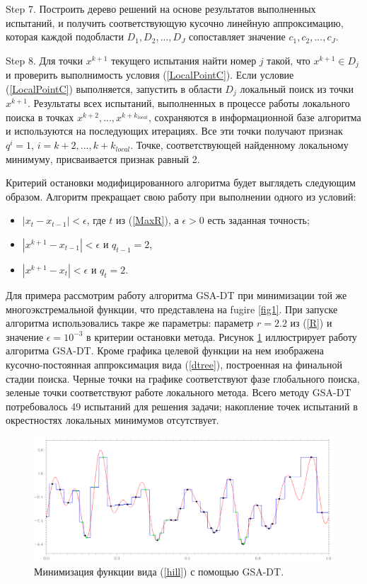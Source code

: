 \documentclass[entropy,article,submit,moreauthors,pdftex]{Definitions/mdpi}
\begin{document}
Step 7. Построить дерево решений на основе результатов выполненных испытаний, и получить соответствующую кусочно линейную аппроксимацию, которая каждой подобласти $D_1, D_2, ..., D_J$ сопоставляет значение $c_1, c_2, ..., c_J$.

Step 8. Для точки $x^{k+1}$ текущего испытания найти номер $j$ такой, что $x^{k+1} \in D_j$ и проверить выполнимость условия (\ref{LocalPointC}). Если условие (\ref{LocalPointC}) выполняется, запустить в области $D_j$ локальный поиск из точки $x^{k+1}$. 
Результаты всех испытаний, выполненных в процессе работы локального поиска в точках $x^{k+2}, ...,x^{k+k_{local}}$, сохраняются в информационной базе алгоритма и используются на последующих итерациях. 
Все эти точки получают признак $q^i=1$, $i = k+2, ... , k+k_{local}$. Точке, соответствующей найденному локальному минимуму, присваивается признак равный 2.

Критерий остановки модифицированного алгоритма будет выглядеть следующим образом. 
Алгоритм прекращает свою работу при выполнении одного из условий:

\begin{itemize}
	\item $|x_{t} - x_{t-1}|<\epsilon$, где $t$ из (\ref{MaxR}), а $\epsilon>0$ есть заданная точность;
	\item $|x^{k+1} - x_{t-1}|<\epsilon$ и $q_{t-1} = 2$,
	\item $|x^{k+1}-x_{t}|<\epsilon$ и $q_{t} = 2$.
\end{itemize}


Для примера рассмотрим работу алгоритма GSA-DT при минимизации той же многоэкстремальной функции, что представлена на fugire \ref{fig1}. При запуске алгоритма использовались такре же параметры: параметр $r=2.2$ из (\ref{R}) и значение $\epsilon = 10^{-3}$ в критерии остановки метода.
Рисунок \ref{fig2} иллюстрирует работу алгоритма GSA-DT. Кроме графика целевой функции на нем изображена кусочно-постоянная аппроксимация вида (\ref{dtree}), построенная на финальной стадии поиска. Черные точки на графике соответствуют фазе глобального поиска, зеленые точки соответствуют работе локального метода. Всего методу GSA-DT потребовалось 49 испытаний для решения задачи; накопление точек испытаний в окрестностях локальных минимумов отсутствует. 
 
\begin{figure}[H]
\includegraphics[width=1.0\linewidth]{HillTree90.png}
\caption{Минимизация функции вида (\ref{hill}) с помощью GSA-DT.}
\label{fig2}
\end{figure}   
\end{document}

